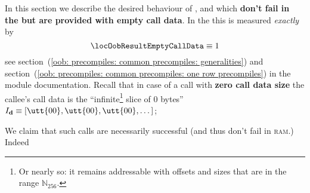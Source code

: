 In this section we describe the desired behaviour of \instEcadd{}, \instEcmul{} and \instEcpairing{} which \textbf{don't fail in the \hubMod{} but are provided with empty call data}.
In the \hubMod{} this is measured \emph{exactly} by
\[
	\locOobResultEmptyCallData \equiv 1
\]
see
section~(\ref{oob: precompiles: common precompiles: generalities}) and
section~(\ref{oob: precompiles: common precompiles: one row precompiles})
in the \oobMod{} module documentation.
Recall that in case of a call with \textbf{zero call data size} the callee's call data is the
``infinite\footnote{Or nearly so: it remains addressable with offsets and sizes that are in the range $\mathbb{N}_{256}$.}
slice of 0 bytes''
$I_\textbf{d} \equiv [\utt{00}, \utt{00}, \utt{00}, \dots]$;

We claim that such calls are necessarily successful (and thus don't fail in \textsc{ram}.)
Indeed
